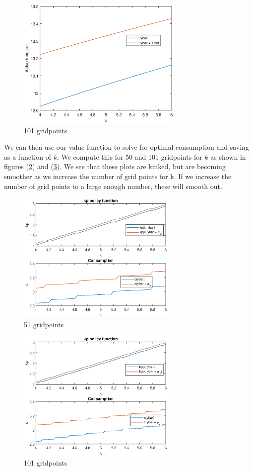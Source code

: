 \documentclass[11pt,letter]{article}
\begin{document}
\begin{figure}[t!]
	\centering
	\includegraphics[height=2.5in]{value_function_101_gridpoints.eps}
	\caption{101 gridpoints}
	\label{fig:101gridpoints}
\end{figure}

We can then use our value function to solve for optimal consumption and saving as a function of $k$. We compute this for 50 and 101 gridpoints for $k$ as shown in figures (\ref{fig:kp51gridpoints}) and (\ref{fig:kp101gridpoints}). We see that these plots are kinked, but are becoming smoother as we increase the number of grid points for k. If we increase the number of grid points to a large enough number, these will smooth out. \\



\begin{figure}[t!]
	\centering
	\includegraphics[height=2.5in]{k_and_p_51_gridpoints.eps}
	\caption{51 gridpoints}
	\label{fig:kp51gridpoints}
\end{figure}

\begin{figure}[t!]
	\centering
	\includegraphics[height=2.5in]{k_and_p_101_gridpoints.eps}
	\caption{101 gridpoints}
	\label{fig:kp101gridpoints}
\end{figure}
\end{document}
